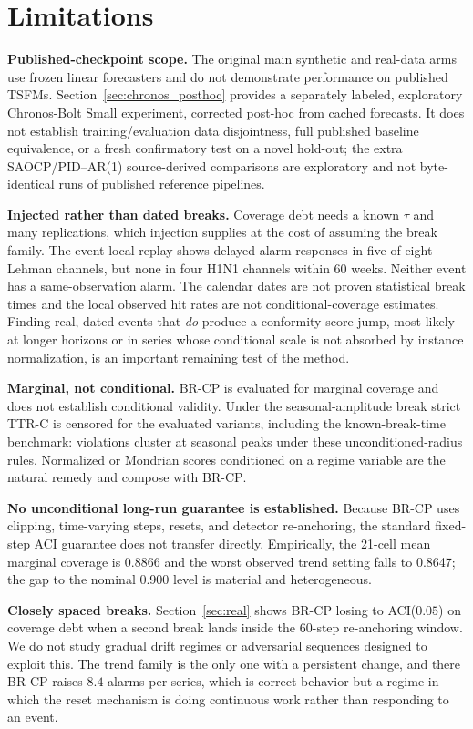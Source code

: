 \documentclass[10pt]{article}
\newcommand{\brcp}{\textsc{BR-CP}}
\begin{document}
\section{Limitations}
\label{sec:limits}

\textbf{Published-checkpoint scope.} The original main synthetic and
real-data arms use frozen linear forecasters and do not demonstrate
performance on published TSFMs. Section~\ref{sec:chronos_posthoc}
provides a separately labeled, exploratory Chronos-Bolt Small
experiment, corrected post-hoc from cached forecasts. It does not
establish training/evaluation data disjointness, full published
baseline equivalence, or a fresh confirmatory test on a novel hold-out; the extra SAOCP/PID--AR(1) source-derived comparisons are exploratory and not byte-identical runs of published reference pipelines.

\textbf{Injected rather than dated breaks.} Coverage debt needs a known $\tau$
and many replications, which injection supplies at the cost of assuming the
break family. The event-local replay shows delayed alarm responses in five of eight Lehman channels, but none in four H1N1 channels within 60 weeks. Neither event has a same-observation alarm. The calendar dates are not proven statistical break times and the local observed hit rates are not conditional-coverage estimates. Finding real, dated events that \emph{do}
produce a conformity-score jump, most likely at longer horizons or in series
whose conditional scale is not absorbed by instance normalization, is an important remaining test of the method.

\textbf{Marginal, not conditional.} BR-CP is evaluated for marginal coverage and does not establish conditional validity. Under
the seasonal-amplitude break strict TTR-C is censored for the evaluated variants, including the known-break-time benchmark: violations cluster at seasonal peaks under these unconditioned-radius rules. Normalized or Mondrian scores conditioned
on a regime variable are the natural remedy and compose with \brcp{}.

\textbf{No unconditional long-run guarantee is established.} Because \brcp{} uses clipping, time-varying steps, resets, and detector re-anchoring, the standard fixed-step ACI guarantee does not transfer directly. Empirically, the 21-cell mean marginal coverage is 0.8866 and the worst observed trend setting falls to 0.8647; the gap to the nominal 0.900 level is material and heterogeneous.

\textbf{Closely spaced breaks.} Section~\ref{sec:real} shows \brcp{} losing to
ACI($0.05$) on coverage debt when a second break lands inside the $60$-step
re-anchoring window. We do not study gradual drift regimes or adversarial
sequences designed to exploit this. The trend family is the only one with a
persistent change, and there \brcp{} raises $8.4$ alarms per series, which is correct
behavior but a regime in which the reset mechanism is doing continuous work
rather than responding to an event.
\end{document}
